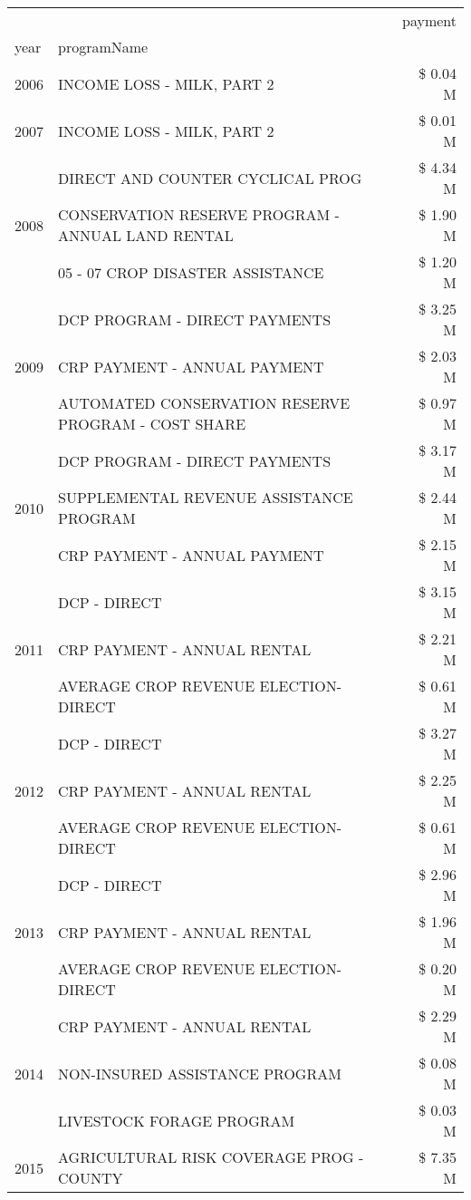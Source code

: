 \begin{tabular}{llr}
\toprule
 &  & payment \\
year & programName &  \\
\midrule
2006 & INCOME LOSS - MILK, PART 2 & \$ 0.04 M \\
\cline{1-3}
2007 & INCOME LOSS - MILK, PART 2 & \$ 0.01 M \\
\cline{1-3}
\multirow[t]{3}{*}{2008} & DIRECT AND COUNTER CYCLICAL PROG & \$ 4.34 M \\
 & CONSERVATION RESERVE PROGRAM - ANNUAL LAND RENTAL & \$ 1.90 M \\
 & 05 - 07 CROP DISASTER ASSISTANCE & \$ 1.20 M \\
\cline{1-3}
\multirow[t]{3}{*}{2009} & DCP PROGRAM - DIRECT PAYMENTS & \$ 3.25 M \\
 & CRP PAYMENT - ANNUAL PAYMENT & \$ 2.03 M \\
 & AUTOMATED CONSERVATION RESERVE PROGRAM - COST SHARE & \$ 0.97 M \\
\cline{1-3}
\multirow[t]{3}{*}{2010} & DCP PROGRAM - DIRECT PAYMENTS & \$ 3.17 M \\
 & SUPPLEMENTAL REVENUE ASSISTANCE PROGRAM & \$ 2.44 M \\
 & CRP PAYMENT - ANNUAL PAYMENT & \$ 2.15 M \\
\cline{1-3}
\multirow[t]{3}{*}{2011} & DCP - DIRECT & \$ 3.15 M \\
 & CRP PAYMENT - ANNUAL RENTAL & \$ 2.21 M \\
 & AVERAGE CROP REVENUE ELECTION-DIRECT & \$ 0.61 M \\
\cline{1-3}
\multirow[t]{3}{*}{2012} & DCP - DIRECT & \$ 3.27 M \\
 & CRP PAYMENT - ANNUAL RENTAL & \$ 2.25 M \\
 & AVERAGE CROP REVENUE ELECTION-DIRECT & \$ 0.61 M \\
\cline{1-3}
\multirow[t]{3}{*}{2013} & DCP - DIRECT & \$ 2.96 M \\
 & CRP PAYMENT - ANNUAL RENTAL & \$ 1.96 M \\
 & AVERAGE CROP REVENUE ELECTION-DIRECT & \$ 0.20 M \\
\cline{1-3}
\multirow[t]{3}{*}{2014} & CRP PAYMENT - ANNUAL RENTAL & \$ 2.29 M \\
 & NON-INSURED ASSISTANCE PROGRAM & \$ 0.08 M \\
 & LIVESTOCK FORAGE PROGRAM & \$ 0.03 M \\
\cline{1-3}
\multirow[t]{3}{*}{2015} & AGRICULTURAL RISK COVERAGE PROG - COUNTY & \$ 7.35 M \\

\end{tabular}
